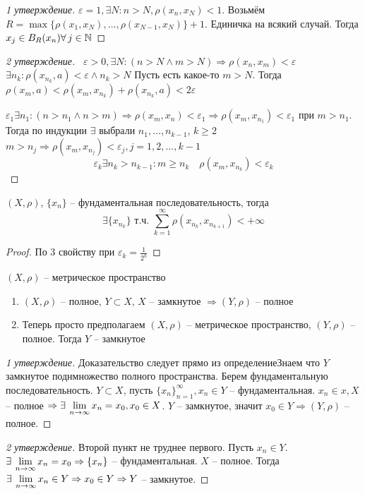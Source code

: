 \documentclass[document]{subfiles}
\begin{document}
\begin{proof}[1 утверждение]
        $\varepsilon = 1, \exists N: n > N, \rho (x_n, x_N) < 1$. Возьмём $R = \max \{\rho(x_1, x_N), \ldots, \rho(x_{N-1},x_{N}) \} + 1$. Единичка на всякий случай.
        Тогда $x_j \in B_R(x_n) \forall j \in \bN$
\end{proof}
\begin{proof}[2 утверждение]
        \ $\varepsilon > 0, \exists N : (n > N \wedge m > N) \Rightarrow \rho(x_n, x_m) < \varepsilon$
            $\exists n_k: \rho(x_{n_k}, a) < \varepsilon \wedge
            n_k > N$
        Пусть есть какое-то $m > N$. Тогда $\rho(x_m, a) < \rho(x_m, x_{n_k}) + \rho(x_{n_k}, a) < 2 \varepsilon$
        \item $\varepsilon_1 \exists n_1: (n > n_1 \wedge n > m) \Rightarrow \rho(x_m,x_n) < \varepsilon_1 \Rightarrow \rho(x_m, x_{n_1}) < \varepsilon_1$ при $m > n_1$.
        Тогда по индукции $\exists$ выбрали $n_1, \ldots, n_{k-1}$, $k \geq 2$
        $m > n_j \Rightarrow \rho (x_m, x_{n_j}) < \varepsilon_j, j = 1,2, \ldots, k-1$
        \[ \varepsilon_k \exists n_k > n_{k-1}: m \geq n_k \quad \rho (x_m, x_{n_k}) < \varepsilon_k \]
\end{proof}

\begin{corollary}
    $(X, \rho)$, $\{x_n\}$ -- фундаментальная последовательность, тогда 
    \[ \exists \{x_{n_k} \} \text { т.ч. } \sum_{k=1}^\infty \rho(x_{n_k}, x_{n_{k+1}}) < + \infty \]
\end{corollary}
\begin{proof}
    По 3 свойству при $\varepsilon_k = \frac{1}{2^k}$
\end{proof}

\begin{theorem}
    $(X,\rho)$ -- метрическое пространство
    \begin{enumerate}
        \item $(X, \rho)$ -- полное, $Y \subset X$, $X$ -- замкнутое $\Rightarrow (Y, \rho)$ -- полное
        \item Теперь просто предполагаем $(X,\rho)$ -- метрическое пространство, $(Y,\rho)$ -- полное. Тогда $Y$ -- замкнутое
    \end{enumerate}
\end{theorem}

\begin{proof}[1 утверждение]
        Доказательство следует прямо из определениеЗнаем что $Y$ замкнутое поднмножество полного пространства.
        Берем фундаментальную последовательность. $Y \subset X$, пусть $\{x_n\}^\infty_{n=1}, x_n \in Y$ -- фундаментальная.
        $x_n \in x, X$ -- полное $\Rightarrow \exists  \liml_{n \to \infty} x_n = x_0, x_0 \in X$. $Y$ -- замкнутое, значит $x_0 \in Y \Rightarrow (Y, \rho)$ -- полное.
\end{proof}
\begin{proof}[2 утверждение]
        Второй пункт не труднее первого. Пусть $x_n \in Y$. $\exists \liml_{n \to \infty} x_n = x_0 \Rightarrow \{x_n\}$ -- фундаментальная.
        $X$ -- полное. Тогда $\exists \liml_{n \to \infty} x_n \in Y \Rightarrow x_0 \in Y \Rightarrow Y$ -- замкнутое.
\end{proof}
\end{document}
